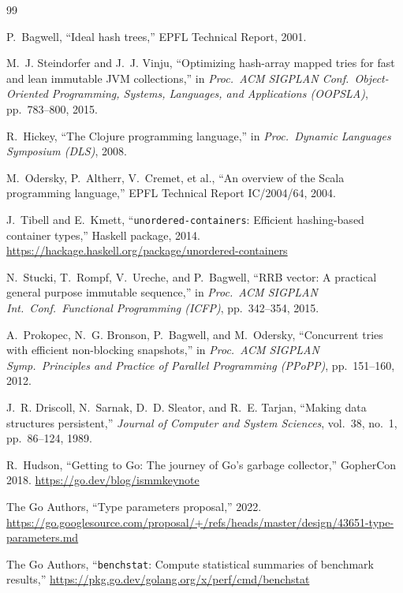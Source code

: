 \documentclass[11pt,twocolumn]{article}
\begin{document}
\begin{thebibliography}{99}

P.~Bagwell,
``Ideal hash trees,''
EPFL Technical Report, 2001.

M.~J. Steindorfer and J.~J. Vinju,
``Optimizing hash-array mapped tries for fast and lean immutable JVM
collections,''
in \emph{Proc.\ ACM SIGPLAN Conf.\ Object-Oriented Programming, Systems,
Languages, and Applications (OOPSLA)}, pp.~783--800, 2015.

R.~Hickey,
``The Clojure programming language,''
in \emph{Proc.\ Dynamic Languages Symposium (DLS)}, 2008.

M.~Odersky, P.~Altherr, V.~Cremet, et al.,
``An overview of the Scala programming language,''
EPFL Technical Report IC/2004/64, 2004.

J.~Tibell and E.~Kmett,
``\texttt{unordered-containers}: Efficient hashing-based container types,''
Haskell package, 2014.
\url{https://hackage.haskell.org/package/unordered-containers}

N.~Stucki, T.~Rompf, V.~Ureche, and P.~Bagwell,
``RRB vector: A practical general purpose immutable sequence,''
in \emph{Proc.\ ACM SIGPLAN Int.\ Conf.\ Functional Programming (ICFP)},
pp.~342--354, 2015.

A.~Prokopec, N.~G. Bronson, P.~Bagwell, and M.~Odersky,
``Concurrent tries with efficient non-blocking snapshots,''
in \emph{Proc.\ ACM SIGPLAN Symp.\ Principles and Practice of Parallel
Programming (PPoPP)}, pp.~151--160, 2012.

J.~R. Driscoll, N.~Sarnak, D.~D. Sleator, and R.~E. Tarjan,
``Making data structures persistent,''
\emph{Journal of Computer and System Sciences}, vol.~38, no.~1,
pp.~86--124, 1989.

R.~Hudson,
``Getting to Go: The journey of Go's garbage collector,''
GopherCon 2018.
\url{https://go.dev/blog/ismmkeynote}

The Go Authors,
``Type parameters proposal,''
2022.
\url{https://go.googlesource.com/proposal/+/refs/heads/master/design/43651-type-parameters.md}

The Go Authors,
``\texttt{benchstat}: Compute statistical summaries of benchmark results,''
\url{https://pkg.go.dev/golang.org/x/perf/cmd/benchstat}

\end{thebibliography}
\end{document}
